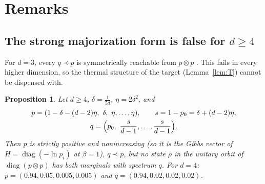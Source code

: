 \documentclass[11pt]{amsart}
\newtheorem{proposition}[lemma]{Proposition}
\theoremstyle{definition}
\theoremstyle{remark}
\numberwithin{equation}{section}
\newcommand{\diag}{\operatorname{diag}}
\begin{document}
\section{Remarks}\label{sec:remarks}

\subsection{The strong majorization form is false for \texorpdfstring{$d\ge4$}{d >= 4}}
For $d=3$, every $q\prec p$ is symmetrically reachable from $p\otimes p$
\cite[Thm.~1]{BakhshinezhadEtAl2019}. This fails in every higher dimension, so the thermal structure of
the target (Lemma~\ref{lem:T}) cannot be dispensed with.

\begin{proposition}\label{prop:counterexample}
Let $d\ge4$, $\delta=\frac1{5d}$, $\eta=2\delta^2$, and
\begin{gather*}
  p=(1-\delta-(d-2)\eta,\ \delta,\ \eta,\dots,\eta),\qquad s=1-p_0=\delta+(d-2)\eta,\\
  q=\Bigl(p_0,\ \frac s{d-1},\dots,\frac s{d-1}\Bigr).
\end{gather*}
Then $p$ is strictly positive and nonincreasing (so it is the Gibbs vector of $H=\diag(-\ln p_i)$ at
$\beta=1$), $q\prec p$, but no state $\rho$ in the unitary orbit of $\diag(p\otimes p)$ has both marginals
with spectrum $q$. For $d=4$: $p=(0.94,0.05,0.005,0.005)$ and $q=(0.94,0.02,0.02,0.02)$.
\end{proposition}
\end{document}
